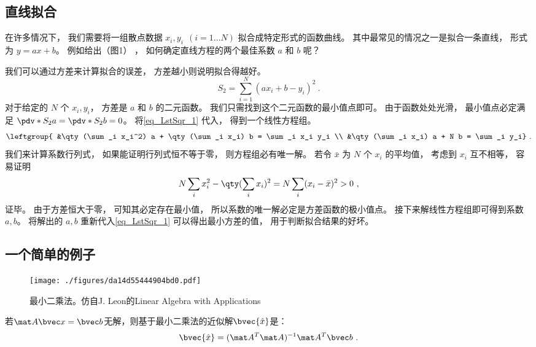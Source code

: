 
\begin{issues}
\issueTODO
\end{issues}


\subsection{直线拟合}
在许多情况下， 我们需要将一组散点数据 $x_i, y_i \ \ (i = 1\dots N)$ 拟合成特定形式的函数曲线。 其中最常见的情况之一是拟合一条直线， 形式为 $y = ax + b$。 例如给出（图1）%
， 如何确定直线方程的两个最佳系数 $a$ 和 $b$ 呢？

我们可以通过方差来计算拟合的误差， 方差越小则说明拟合得越好。
\begin{equation}\label{eq_LstSqr_1}
S_2 = \sum_{i = 1}^N (a x_i + b - y_i)^2~.
\end{equation}
对于给定的 $N$ 个 $x_i, y_i$， 方差是 $a$ 和 $b$ 的二元函数。 我们只需找到这个二元函数的最小值点即可。 由于函数处处光滑， 最小值点必定满足 $\pdv*{S_2}{a} = \pdv*{S_2}{b} = 0$。 将\autoref{eq_LstSqr_1} 代入， 得到一个线性方程组。
\begin{equation}
\leftgroup{
&\qty(\sum_i x_i^2) a + \qty(\sum_i x_i) b = \sum_i x_i y_i \\
&\qty(\sum_i x_i) a + N b = \sum_i y_i}~.
\end{equation}
我们来计算系数行列式， 如果能证明行列式恒不等于零， 则方程组必有唯一解。%
若令 $\bar x$ 为 $N$ 个 $x_i$ 的平均值， 考虑到 $x_i$ 互不相等， 容易证明
\begin{equation}
N\sum_i x_i^2 - \qty(\sum_i x_i)^2 = N\sum_i (x_i - \bar x)^2 > 0~,
\end{equation}
证毕。 由于方差恒大于零， 可知其必定存在最小值， 所以系数的唯一解必定是方差函数的极小值点。 接下来解线性方程组即可得到系数 $a, b$。 将解出的 $a,b$ 重新代入\autoref{eq_LstSqr_1} 可以得出最小方差的值， 用于判断拟合结果的好坏。

\subsection{一个简单的例子}
\begin{figure}[ht]
\centering
\texttt{[image: ./figures/da14d55444904bd0.pdf]}
\caption{最小二乘法。仿自J. Leon的Linear Algebra with Applications} \label{fig_LstSqr_1}
\end{figure}
若$\mat A \bvec x = \bvec b$无解，则基于最小二乘法的近似解$\bvec {\hat x} $是：
\begin{equation}
\bvec {\hat x} = (\mat A^T \mat A)^{-1}\mat A^T \bvec b~.
\end{equation}

